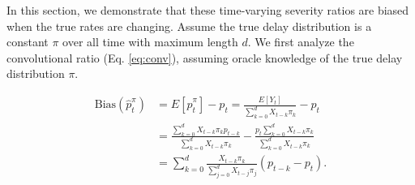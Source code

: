 \documentclass{article}
\begin{document}
In this section, we demonstrate that these time-varying severity ratios are biased when the true rates are changing. Assume the true delay distribution is a constant $\pi$ over all time with maximum length $d$. We first analyze the convolutional ratio (Eq. \eqref{eq:conv}), assuming oracle knowledge of the true delay distribution $\pi$.


\begin{align}\label{eq:ConvBias}
    \text{Bias}(\hat{p}_t^\pi) &= E[\hat{p}_t^\pi] - p_t = \frac{E[Y_t]}{\sum_{k=0}^d X_{t-k}\pi_k} - p_t \nonumber\\ 
    &= \frac{\sum_{k=0}^d X_{t-k}\pi_k p_{t-k}}{\sum_{k=0}^d X_{t-k}\pi_k} - \frac{p_t \sum_{k=0}^d X_{t-k}\pi_k}{\sum_{k=0}^d X_{t-k}\pi_k}\nonumber\\
    &= \sum_{k=0}^d \frac{X_{t-k}\pi_k}{\sum_{j=0}^d X_{t-j}\pi_j} (p_{t-k}-p_t).
\end{align}
\end{document}
